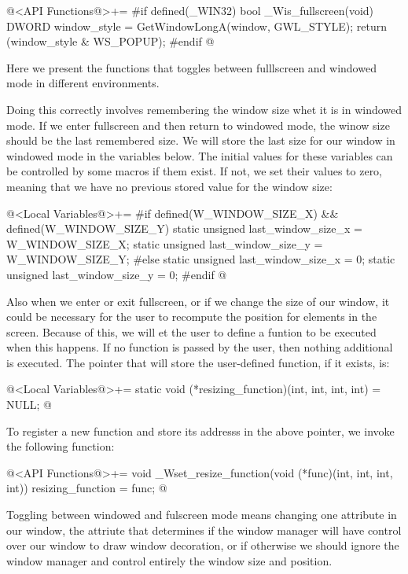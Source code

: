 \iniciocodigo
@<API Functions@>+=
#if defined(_WIN32)
bool _Wis_fullscreen(void){
  DWORD window_style = GetWindowLongA(window, GWL_STYLE);
  return (window_style & WS_POPUP);
}
#endif
@


Here we present the functions that toggles between fulllscreen and
windowed mode in different environments.

Doing this correctly involves remembering the window size whet it is
in windowed mode. If we enter fullscreen and then return to windowed
mode, the winow size should be the last remembered size. We will store
the last size for our window in windowed mode in the variables
below. The initial values for these variables can be controlled by
some macros if them exist. If not, we set their values to zero,
meaning that we have no previous stored value for the window size:

\iniciocodigo
@<Local Variables@>+=
#if defined(W_WINDOW_SIZE_X) && defined(W_WINDOW_SIZE_Y)
static unsigned last_window_size_x = W_WINDOW_SIZE_X;
static unsigned last_window_size_y = W_WINDOW_SIZE_Y;
#else
static unsigned last_window_size_x = 0;
static unsigned last_window_size_y = 0;
#endif
@
\fimcodigo

Also when we enter or exit fullscreen, or if we change the size of our
window, it could be necessary for the user to recompute the position
for elements in the screen. Because of this, we will et the user to
define a funtion to be executed when this happens. If no function is
passed by the user, then nothing additional is executed. The pointer
that will store the user-defined function, if it exists, is:

\iniciocodigo
@<Local Variables@>+=
static void (*resizing_function)(int, int, int, int) = NULL;
@
\fimcodigo

To register a new function and store its addresss in the above
pointer, we invoke the following function:

\iniciocodigo
@<API Functions@>+=
void _Wset_resize_function(void (*func)(int, int, int, int)){
  resizing_function = func;
}
@
\fimcodigo


Toggling between windowed and fulscreen mode means changing one
attribute in our window, the attriute that determines if the window
manager will have control over our window to draw window decoration,
or if otherwise we should ignore the window manager and control
entirely the window size and position.

